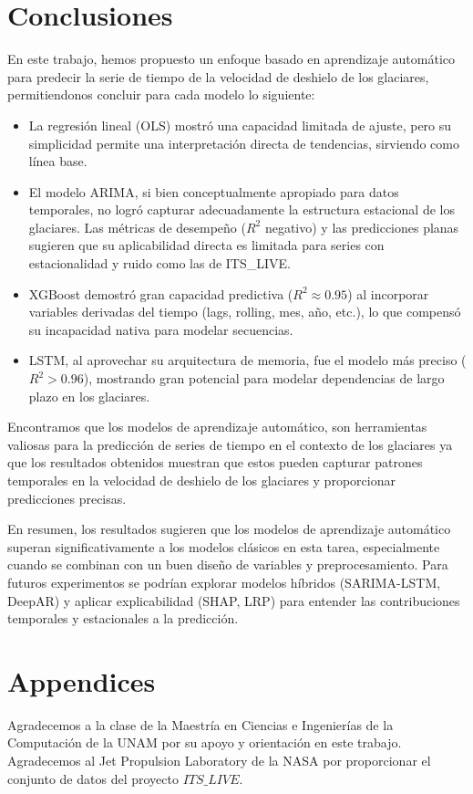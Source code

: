 \documentclass[sigconf,authordraft,language=spanish]{acmart}
\begin{document}
\section{Conclusiones}

En este trabajo, hemos propuesto un enfoque basado en aprendizaje automático para predecir la serie de tiempo de la velocidad de deshielo de los glaciares, permitiendonos concluir para
cada modelo lo siguiente:
\begin{itemize}
  \item La regresión lineal (OLS) mostró una capacidad limitada de ajuste, pero su simplicidad permite una interpretación directa de tendencias, sirviendo como línea base.
  \item El modelo ARIMA, si bien conceptualmente apropiado para datos temporales, no logró capturar adecuadamente la estructura estacional de los glaciares. Las métricas de 
desempeño ($R^2$ negativo) y las predicciones planas sugieren que su aplicabilidad directa es limitada para series con estacionalidad y ruido como las de ITS\_LIVE.
  \item XGBoost demostró gran capacidad predictiva ($R^2 \approx 0.95$) al incorporar variables derivadas del tiempo (lags, rolling, mes, año, etc.), lo que compensó su incapacidad nativa para modelar secuencias.
  \item LSTM, al aprovechar su arquitectura de memoria, fue el modelo más preciso ($R^{2} > 0.96$), mostrando gran potencial para modelar dependencias de largo plazo en los glaciares.

  \end{itemize}
Encontramos que los modelos de aprendizaje automático, son herramientas valiosas para la predicción de series de tiempo en el contexto de los glaciares ya que los resultados obtenidos muestran que estos  
pueden capturar patrones temporales en la velocidad de deshielo de los glaciares y proporcionar predicciones precisas.

En resumen, los resultados sugieren que los modelos de aprendizaje automático superan significativamente a los modelos clásicos en esta tarea, especialmente cuando se combinan con un buen diseño de variables y preprocesamiento. 
Para futuros experimentos  se podrían explorar modelos híbridos (SARIMA-LSTM, DeepAR) y aplicar explicabilidad (SHAP, LRP) para entender las contribuciones temporales y estacionales a la predicción.

\section{Appendices}
\begin{acks}
Agradecemos a la clase de la Maestría en Ciencias e Ingenierías de la Computación de la UNAM por su apoyo y orientación en este trabajo.
Agradecemos al Jet Propulsion Laboratory de la NASA por proporcionar el conjunto de datos del proyecto  $ITS\_LIVE$.
\end{acks}




\appendix
\end{document}
